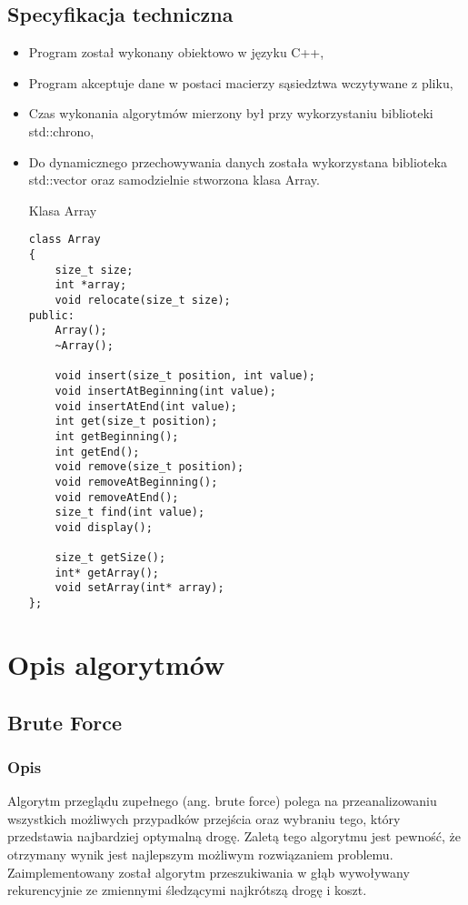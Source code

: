 \documentclass[12pt,a4paper,titlepage]{article}
\begin{document}
\subsection{Specyfikacja techniczna}
\begin{itemize}
    \item Program został wykonany obiektowo w języku C++,
    \item Program akceptuje dane w postaci macierzy sąsiedztwa wczytywane z pliku,
    \item Czas wykonania algorytmów mierzony był przy wykorzystaniu biblioteki std::chrono,
    \item Do dynamicznego przechowywania danych została wykorzystana biblioteka std::vector oraz samodzielnie stworzona klasa Array.
\begin{listing}[H]
\label{code:array}
\caption{Klasa Array}
\begin{verbatim}
class Array
{
    size_t size;
    int *array;
    void relocate(size_t size);
public:
    Array();
    ~Array();

    void insert(size_t position, int value);
    void insertAtBeginning(int value);
    void insertAtEnd(int value);
    int get(size_t position);
    int getBeginning();
    int getEnd();
    void remove(size_t position);
    void removeAtBeginning();
    void removeAtEnd();
    size_t find(int value);
    void display();

    size_t getSize();
    int* getArray();
    void setArray(int* array);
};
\end{verbatim}
\end{listing}
\end{itemize}


\section{Opis algorytmów}

\subsection{Brute Force}
\subsubsection{Opis}
Algorytm przeglądu zupełnego (ang. brute force) polega na przeanalizowaniu wszystkich możliwych przypadków przejścia oraz wybraniu tego, który przedstawia najbardziej optymalną drogę. Zaletą tego algorytmu jest pewność, że otrzymany wynik jest najlepszym możliwym rozwiązaniem problemu. Zaimplementowany został algorytm przeszukiwania w głąb wywoływany rekurencyjnie ze zmiennymi śledzącymi najkrótszą drogę i koszt.
\end{document}

